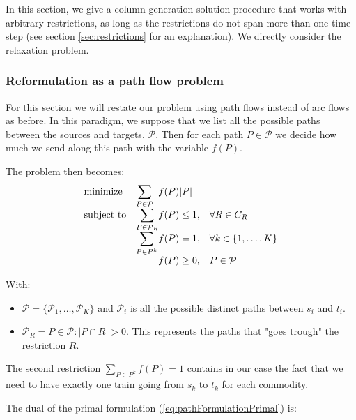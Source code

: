 \documentclass[14pt,a4paper]{article}
\theoremstyle{definition}
\numberwithin{equation}{subsection}
\begin{document}
In this section, we give a column generation solution procedure that works with arbitrary restrictions, as long as the restrictions do not span more than one time step (see section \ref*{sec:restrictions} for an explanation). We directly consider the relaxation problem.

\subsubsection{Reformulation as a path flow problem}


For this section we will restate our problem using path flows instead of arc flows as before. In this paradigm, we suppose that we list all the possible paths between the sources and targets, $\mathcal{P}$. Then for each path $P \in \mathcal{P}$ we decide how much we send along this path with the variable $f(P)$.


 The problem then becomes: 
\begin{equation}
	\begin{array}{ll@{}ll}
		\text{minimize}  & \displaystyle\sum\limits_{P \in \mathcal{P}} &f(P)|P| &\\
		\text{subject to}& \displaystyle\sum\limits_{P \in \mathcal{P}_R}   &f(P) \leq 1,  &\forall R \in C_R\\
	& \displaystyle\sum\limits_{P \in P^k}   &f(P) = 1,  &\forall k \in \{1,\ldots,K\}\\
		&                                                &f(P) \geq 0, &P\in \mathcal{P}
	\end{array}
\label{eq:pathFormulationPrimal}
\end{equation}

With: 
\begin{itemize}
	\item $\mathcal{P} = \{\mathcal{P}_1,\ldots,\mathcal{P}_K\}$ and $\mathcal{P}_i$ is all the possible distinct paths between $s_i$ and $t_i$.
	\item $\mathcal{P}_R = {P \in \mathcal{P}: |P\cap R| > 0 }$. This represents the paths that "goes trough" the restriction $R$.
\end{itemize}

The second restriction $\sum_{P \in P^k} f(P) = 1$ contains in our case the fact that we need to have exactly one train going from $s_k$ to $t_k$ for each commodity.


The dual of the primal formulation (\ref{eq:pathFormulationPrimal}) is:
\end{document}
